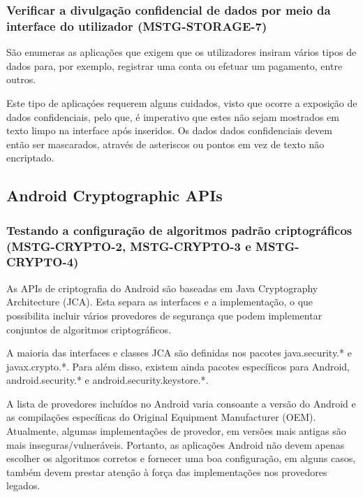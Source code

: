 \documentclass{article}
\begin{document}
\subsubsection{Verificar a divulgação confidencial de dados por meio da interface do utilizador (MSTG-STORAGE-7)}
\par São enumeras as aplicações que exigem que os utilizadores insiram vários tipos de dados para, por exemplo, registrar uma conta ou efetuar um pagamento, entre outros. 
\par Este tipo de aplicaçóes requerem alguns cuidados, visto que ocorre a exposição de dados confidenciais, pelo que, é imperativo que estes não sejam mostrados em texto limpo na interface após inseridos. Os dados dados confidenciais devem então ser mascarados, através de asteriscos ou pontos em vez de texto não encriptado.






\newpage
\subsection{Android Cryptographic APIs}

\subsubsection{Testando a configuração de algoritmos padrão criptográficos (MSTG-CRYPTO-2, MSTG-CRYPTO-3 e MSTG-CRYPTO-4)}
\par As APIs de criptografia do Android são baseadas em Java Cryptography Architecture (JCA). Esta separa as interfaces e a implementação, o que possibilita incluir vários provedores de segurança que podem implementar conjuntos de algoritmos criptográficos.
\par A maioria das interfaces e classes JCA são definidas nos pacotes java.security.* e javax.crypto.*. Para além disso, existem ainda pacotes específicos para Android, android.security.* e android.security.keystore.*.

\par A lista de provedores incluídos no Android varia consoante a versão do Android e as compilações específicas do Original Equipment Manufacturer (OEM). Atualmente, algumas implementações de provedor, em versões mais antigas são mais inseguras/vulneráveis. Portanto, as aplicações Android não devem apenas escolher os algoritmos corretos e fornecer uma boa configuração, em alguns casos, também devem prestar atenção à força das implementações nos provedores legados.
\end{document}
